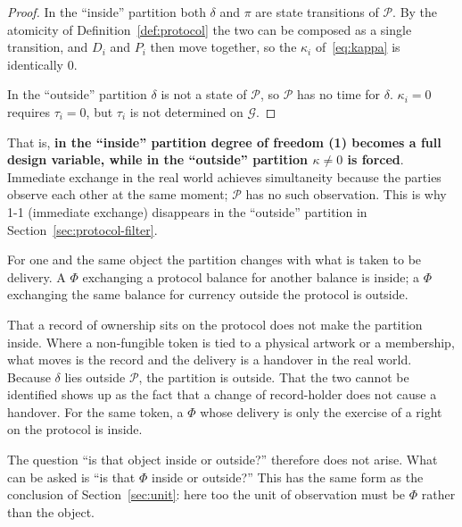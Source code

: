 \begin{proof}
In the ``inside'' partition both $\delta$ and $\pi$ are state transitions of $\mathcal{P}$.
By the atomicity of Definition~\ref{def:protocol} the two can be composed as a single
transition,
and $D_i$ and $P_i$ then move together, so the $\kappa_i$ of~\eqref{eq:kappa} is identically
$0$.

In the ``outside'' partition $\delta$ is not a state of $\mathcal{P}$, so $\mathcal{P}$ has
no time for $\delta$. $\kappa_i=0$ requires $\tau_i=0$, but $\tau_i$ is not determined on
$\mathcal{G}$.
\end{proof}

That is, \textbf{in the ``inside'' partition degree of freedom (1) becomes a full design
variable, while in the ``outside'' partition $\kappa\neq 0$ is forced}.
Immediate exchange in the real world achieves simultaneity because the parties observe each
other at the same moment; $\mathcal{P}$ has no such observation. This is why 1-1 (immediate
exchange) disappears in the ``outside'' partition in Section~\ref{sec:protocol-filter}.

\begin{remark}
\label{rem:case-is-phi}
For one and the same object the partition changes with what is taken to be delivery. A $\Phi$
exchanging a protocol balance for another balance is inside; a $\Phi$ exchanging the same
balance for currency outside the protocol is outside.

That a record of ownership sits on the protocol does not make the partition inside. Where a
non-fungible token is tied to a physical artwork or a membership, what moves is the record and
the delivery is a handover in the real world. Because $\delta$ lies outside $\mathcal{P}$,
the partition is outside. That the two cannot be identified shows up as the fact that a
change of record-holder does not cause a handover. For the same token, a $\Phi$ whose
delivery is only the exercise of a right on the protocol is inside.

The question ``is that object inside or outside?'' therefore does not arise. What can be
asked is ``is that $\Phi$ inside or outside?'' This has the same form as the conclusion of
Section~\ref{sec:unit}: here too the unit of observation must be $\Phi$ rather than the
object.
\end{remark}

